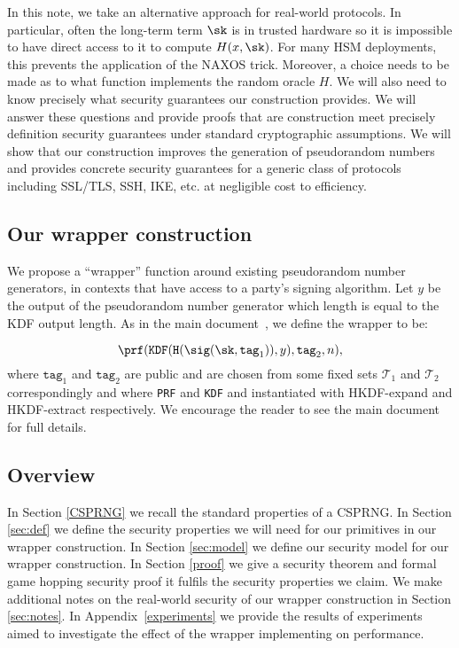 \documentclass{article}
\begin{document}
In this note, we take an alternative approach for real-world protocols.
In particular, often the long-term term $\sk$ is in trusted hardware so
it is impossible to have direct access to it to compute $H(x, \sk)$.
For many HSM deployments, this prevents the application of the NAXOS
trick.
Moreover, a choice needs to be made as to what function implements the
random oracle $H$. We will also need to know precisely what security
guarantees our construction provides.  We will answer these questions
and provide proofs that are construction meet precisely definition
security guarantees under standard cryptographic assumptions. We will
show that our construction improves the generation of pseudorandom
numbers and provides concrete security guarantees for a generic class of
protocols including SSL/TLS, SSH, IKE, etc. at negligible cost to efficiency. 

\subsection*{Our wrapper construction}

We propose a ``wrapper'' function around existing
pseudorandom number generators, in contexts that have access to a
party's signing algorithm. Let $y$ be the output of the pseudorandom
number generator which length is equal to the KDF output length. As in the main document~\cite{randomnessirtf}, we define the wrapper to be:

$$
\prf(\texttt{KDF}( \texttt{H}(\sig (\sk, \texttt{tag}_1)),y), \texttt{tag}_2, n),
$$
where $\texttt{tag}_1$ and $\texttt{tag}_2$ are public and are chosen
from some fixed sets $\mathcal{T}_1$ and $\mathcal{T}_2$ correspondingly
and where \texttt{PRF} and \texttt{KDF} and instantiated with
HKDF-expand and HKDF-extract respectively.
We encourage the reader to see the main document~\cite{randomnessirtf} for full details.

\subsection*{Overview}
In Section \ref{CSPRNG} we recall the standard properties of a CSPRNG. In Section \ref{sec:def} we define the security properties we will need for our primitives in our wrapper construction. In Section \ref{sec:model} we define our security model for our wrapper construction. In Section \ref{proof} we give a security theorem and formal game hopping security proof it fulfils the security properties we claim. We make additional notes on the real-world security of our wrapper construction in Section \ref{sec:notes}.
In Appendix~\ref{experiments} we provide the results of experiments aimed to investigate the effect of the wrapper implementing on performance.
\end{document}
